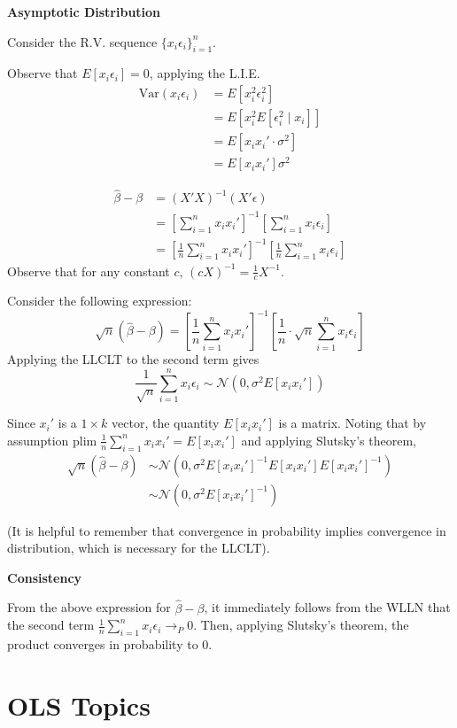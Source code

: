 \documentclass[16pt]{article}
\newcommand{\bh}{\hat{\beta}}
\newcommand{\norm}{\mathcal{N}}
\newcommand{\plim}{\text{plim}\; }
\newcommand{\Var}{\text{Var}}
\begin{document}
\textbf{Asymptotic Distribution}

Consider the R.V. sequence $\{x_i \epsilon_i\}_{i=1}^n$.

Observe that $E[x_i \epsilon_i] = 0$, applying the L.I.E.
\begin{align*}
  \Var(x_i \epsilon_i) &= E[x_i^2 \epsilon_i^2]\\
      &= E[x_i^2 E[\epsilon_i^2 \mid x_i]]\\
      &= E[x_i x_i' \cdot \sigma^2]\\
      &= E[x_i x_i'] \sigma^2
\end{align*}

\begin{align*}
\bh - \beta &= (X'X)^{-1}(X'\epsilon)\\
  &= [\sum_{i=1}^n x_i x_i']^{-1}[\sum_{i=1}^n x_i\epsilon_i]\\
  &= [\frac{1}{n} \sum_{i=1}^n x_i x_i']^{-1}[\frac{1}{n}\sum_{i=1}^n x_i\epsilon_i]
\end{align*}
Observe that for any constant $c$, $(cX)^{-1} = \frac{1}{c}X^{-1}$.

Consider the following expression:
$$\sqrt{n}(\bh - \beta) = [\frac{1}{n} \sum_{i=1}^n x_i x_i']^{-1}[\frac{1}{n} \cdot \sqrt{n} \sum_{i=1}^n x_i\epsilon_i]$$
Applying the LLCLT to the second term gives 
$$\frac{1}{\sqrt{n}} \sum_{i=1}^n x_i \epsilon_i \sim \norm(0, \sigma^2 E[x_i x_i'])$$

Since $x_i'$ is a $1 \times k$ vector, the quantity $E[x_i x_i']$ is a matrix. Noting that by assumption $\plim \frac{1}{n} \sum_{i=1}^n x_i x_i' = E[x_i x_i']$ and applying Slutsky's theorem, 
\begin{align*}
  \sqrt{n}(\bh - \beta) &\sim \norm(0, \sigma^2 E[x_i x_i']^{-1} E[x_i x_i'] E[x_i x_i']^{-1})\\
  &\sim \norm(0, \sigma^2 E[x_i x_i']^{-1})
\end{align*}

(It is helpful to remember that convergence in probability implies convergence in distribution, which is necessary for the LLCLT).

\textbf{Consistency}

From the above expression for $\bh - \beta$, it immediately follows from the WLLN that the second term $\frac{1}{n} \sum_{i=1}^n x_i \epsilon_i \to_P 0$. Then, applying Slutsky's theorem, the product converges in probability to $0$.

\section*{OLS Topics}
\end{document}
